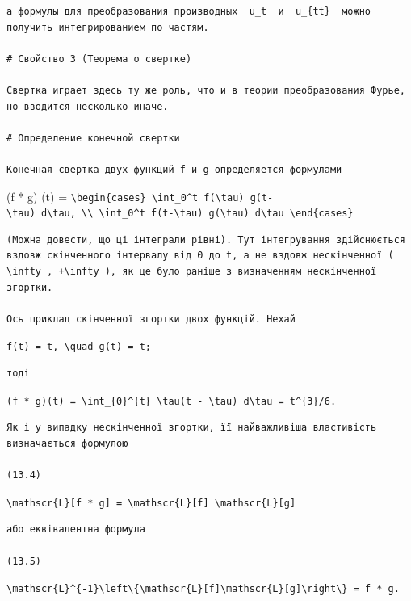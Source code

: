 \documentclass[
  ukrainian,
]{article}
\begin{document}
\begin{verbatim}
а формулы для преобразования производных  u_t  и  u_{tt}  можно получить интегрированием по частям.

# Свойство 3 (Теорема о свертке)

Свертка играет здесь ту же роль, что и в теории преобразования Фурье, но вводится несколько иначе.

# Определение конечной свертки

Конечная свертка двух функций f и g определяется формулами
\end{verbatim}

(f * g) (t) =
\texttt{\textbackslash{}begin\{cases\}\ \textbackslash{}int\_0\^{}t\ f(\textbackslash{}tau)\ g(t-\textbackslash{}tau)\ d\textbackslash{}tau,\ \textbackslash{}\textbackslash{}\ \textbackslash{}int\_0\^{}t\ f(t-\textbackslash{}tau)\ g(\textbackslash{}tau)\ d\textbackslash{}tau\ \textbackslash{}end\{cases\}}

\begin{verbatim}
(Можна довести, що ці інтеграли рівні). Тут інтегрування здійснюється вздовж скінченного інтервалу від 0 до t, а не вздовж нескінченної ( \infty , +\infty ), як це було раніше з визначенням нескінченної згортки.

Ось приклад скінченної згортки двох функцій. Нехай
\end{verbatim}

\texttt{f(t)\ =\ t,\ \textbackslash{}quad\ g(t)\ =\ t;}

\begin{verbatim}
тоді
\end{verbatim}

\texttt{(f\ *\ g)(t)\ =\ \textbackslash{}int\_\{0\}\^{}\{t\}\ \textbackslash{}tau(t\ -\ \textbackslash{}tau)\ d\textbackslash{}tau\ =\ t\^{}\{3\}/6.}

\begin{verbatim}
Як і у випадку нескінченної згортки, її найважливіша властивість визначається формулою

(13.4)
\end{verbatim}

\texttt{\textbackslash{}mathscr\{L\}{[}f\ *\ g{]}\ =\ \textbackslash{}mathscr\{L\}{[}f{]}\ \textbackslash{}mathscr\{L\}{[}g{]}}

\begin{verbatim}
або еквівалентна формула

(13.5)
\end{verbatim}

\texttt{\textbackslash{}mathscr\{L\}\^{}\{-1\}\textbackslash{}left\textbackslash{}\{\textbackslash{}mathscr\{L\}{[}f{]}\textbackslash{}mathscr\{L\}{[}g{]}\textbackslash{}right\textbackslash{}\}\ =\ f\ *\ g.}
\end{document}
